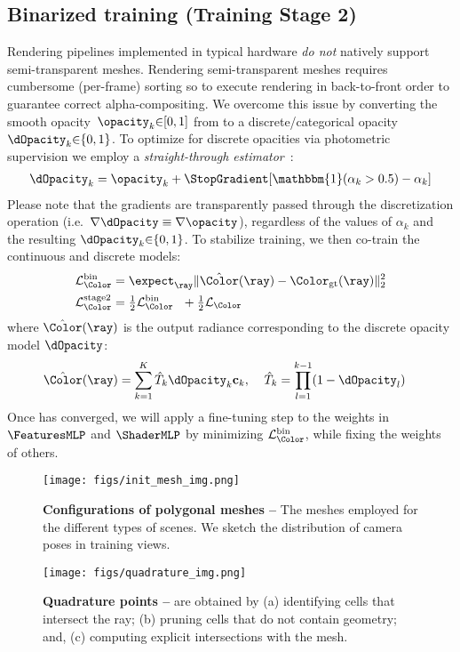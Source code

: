 \subsection{Binarized training (Training Stage 2)}
\label{sec:stage2}
Rendering pipelines implemented in typical hardware \textit{do not} natively support semi-transparent meshes. Rendering semi-transparent meshes requires cumbersome (per-frame) sorting so to execute rendering in back-to-front order to guarantee correct alpha-compositing.
We overcome this issue by converting the smooth opacity~$\opacity_k{\in}[0,1]$ from  to a discrete/categorical opacity $\dOpacity_k{\in}\{0,1\}$.
To optimize for discrete opacities via photometric supervision we employ a \textit{straight-through estimator}~\cite{straightthrough}:
\begin{align}
\dOpacity_k = \opacity_k + \StopGradient[ \mathbbm{1}(\alpha_k>0.5) - \alpha_k ]
\label{eq:dOpacity}
\end{align}
Please note that the gradients are transparently passed through the discretization operation (i.e.~$\nabla \dOpacity \equiv \nabla \opacity$), regardless of the values of $\alpha_k$ and the resulting $\dOpacity_k{\in}\{0,1\}$.
To stabilize training, we then co-train the continuous and discrete models:
\begin{align}
\mathcal{L}_\Color^\text{bin} &=
\expect_{\ray}
\| \hat\Color(\ray) - \Color_\text{gt}(\ray) \|_2^2 \\
\mathcal{L}_\Color^\text{stage2} &=
\tfrac{1}{2} \mathcal{L}_\Color^\text{bin}
~~+
\tfrac{1}{2} \mathcal{L}_\Color
\label{eq:MSE_plus_binary}
\end{align}
where $\hat\Color(\ray)$ is the output radiance corresponding to the discrete opacity model $\dOpacity$:
\begin{align}
\hat\Color(\ray) &= \sum_{k = 1}^{K}
\hat{T}_k \dOpacity_k \mathbf{c}_k, \;\;\;\;
\hat{T}_k = \prod_{l=1}^{k-1}(1-\dOpacity_l)
\label{eq:col_binarized}
\end{align}
Once  has converged, we will apply a fine-tuning step to the weights in $\FeaturesMLP$ and $\ShaderMLP$ by minimizing $\mathcal{L}_\Color^\text{bin}$, while fixing the weights of others.


\begin{figure}[t!]
\begin{center}
\texttt{[image: figs/init\_mesh\_img.png]}
\end{center}
\caption{
\textbf{Configurations of polygonal meshes --}
The meshes employed for the different types of scenes.
We sketch the distribution of camera poses in training views.
}
\label{fig:init_mesh}
\end{figure}  \begin{figure}[t]
\begin{center}
\texttt{[image: figs/quadrature\_img.png]}
\end{center}
\caption{
\textbf{Quadrature points --} are obtained by
(a) identifying cells that intersect the ray; 
(b) pruning cells that do not contain geometry; and,
(c) computing explicit intersections with the mesh.}
\label{fig:quadrature}
\end{figure}  



